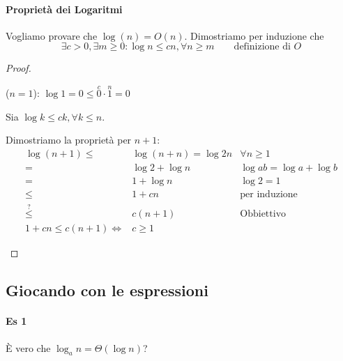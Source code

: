             \paragraph{Proprietà dei Logaritmi}
                Vogliamo provare che $ \log(n) = O(n) $. Dimostriamo per induzione che
                $$
                    \exists c>0,\exists m\geq 0:\log n\leq cn,\forall n\geq m\qquad \text{definizione di }O
                $$
                \begin{proof}
                    \begin{basecase} ($ n=1 $):
                        $ \log 1 = 0 \leq \stackrel{c}0\cdot \stackrel{n}1 = 0 $
                    \end{basecase}
                    \begin{inductiveipothesis}
                        Sia $ \log k \leq ck, \forall k\leq n $.
                    \end{inductiveipothesis}
                    \begin{inductivecase}
                        Dimostriamo la proprietà per $ n+1 $:
                        $$
                            \begin{aligned}
                                \log(n+1) \leq & \log(n+n) = \log 2n & \forall n\geq 1 \\
                                = & \log 2 + \log n \qquad & \log ab = \log a + \log b \\
                                = & 1 + \log n & \log 2 = 1 \\
                                \leq & 1 + cn & \text{per induzione} \\
                                \stackrel{?}{\leq} & c(n+1) & \text{Obbiettivo} \\
                                1+cn\leq c(n+1) \Leftrightarrow & c\geq 1
                            \end{aligned}
                        $$
                    \end{inductivecase}
                \end{proof}
        \subsection{Giocando con le espressioni}
            \paragraph{Es 1}
                È vero che $ \log_a n = \Theta(\log n) $?

